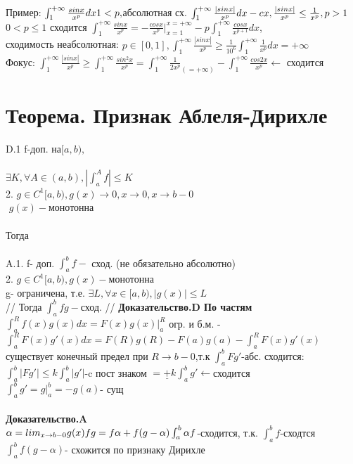 ﻿\documentclass[12pt, a4paper]{article}
\begin{document}
Пример: $ \int_1^{+\infty} \frac{sinx}{x^p} dx\\
 1<p, $абсолютная сх. $ \int_1^{+\infty} \frac{|sinx|}{x^p}dx - cx, \frac{|sinx|}{x^p} \leq \frac{1}{x^p}, p>1\\ $
 \\
 $ 0<p\leq 1 $ сходится $ \int_1^{+\infty} \frac{sinx}{x^p}= -\frac{cosx}{x^p}|_{x=1}^{x=+\infty} -p \int_1^{+\infty} \frac{cosx}{x^{p+1}}dx $, \\
 сходимость неабсолютная: $ p \in [0,1], \int_1^{+\infty}\frac{|sinx|}{x^p}\geq \frac{1}{10^6}\int_1^{+\infty} \frac{1}{x^p}dx =+\infty $\\
 Фокус: $ \int_1^{+\infty} \frac{|sinx|}{x^p}\geq \int_1^{+\infty}\frac{sin^2x}{x^p}=\int_1^{+\infty}\frac{1}{2x^p}_{(=+\infty)}-\int_1^{+\infty}\frac{cos2x}{x^p} \leftarrow$ сходится\\
 \section{Теорема. Признак Аблеля-Дирихле}
 D.1 f-доп. на$ [a,b),$ \\
  \\
  $ \exists K, \forall A \in (a,b), |\int_a^A f| \leq K $\\
  2. $ g \in C^1[a,b), g(x) \rightarrow 0, x\rightarrow 0, x\rightarrow b - 0$\\$  $
$ g(x)- $монотонна\\
\\
Тогда \\
\\
A.1. f- доп.  $ \int_a^b f - $ сход. (не обязательно абсолютно)\\
 2. $ g \in C^1 [a,b), g(x)- $монотонна\\
 g- ограничена, т.е. $ \exists L, \forall x \in  [a,b), |g(x)|\leq L $\\
//
 Тогда $\int_a^b fg- $сход.
//     
\textbf{Доказательство.D По частям}\\
$ \int_a^R f(x)g(x)dx =F(x)g(x)|_a^R$ огр. и б.м. -$ \int_a^R F(x)g'(x)dx =F(R)g(R)-F(a)g(a) -\int_a^R F(x)g'(x) $ существует конечный предел при $ R \rightarrow b - 0 $,т.к $ \int_a^b Fg'$-абс. сходится:\\  $ \int_a^b |Fg'| \leq k \int_a^b|g'| $-c пост знаком $ = \underline{+} k \int_a^b g' \leftarrow$сходится \\ 
$ \int_a^b g' = g|_a^b= -g(a) $- сущ \\
\\
\textbf{Доказательство.A}\\
$ \alpha = lim_{x \rightarrow b - 0} g(x)\\
fg=f \alpha + f(g-\alpha)\\
\int_a^b \alpha f  $-сходится, т.к. $\int_a^b f  $-сходтся\\
$ \int_a^b  f(g - \alpha) $-  схожится по признаку Дирихле\\
\end{document}
